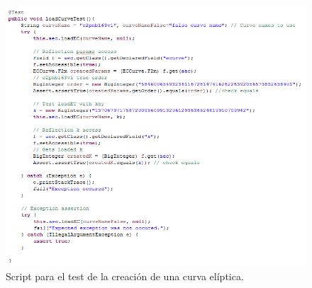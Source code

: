 \documentclass[../PFC.tex]{subfiles}
\begin{document}
\begin{figure}[H]
  \centering
  \includegraphics[width=1\textwidth]{./img/loadCurveTest}
  \caption{Script para el test de la creación de una curva elíptica.}
  \label{img:loadCurveTest}
\end{figure}
\end{document}
